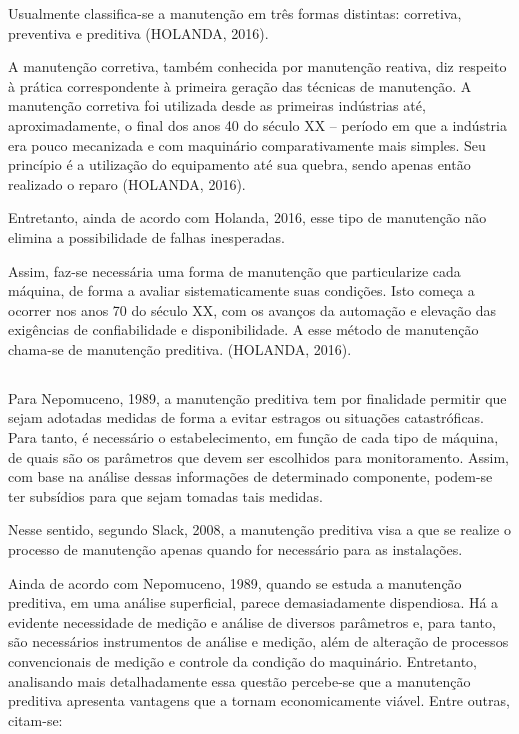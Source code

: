 \documentclass[
	12pt,				
	oneside,			
	a4paper,			
	english,			
	brazil,			
	]{abntex2ppgsi}
\begin{document}
	Usualmente classifica-se a manutenção em três formas distintas: corretiva, preventiva e preditiva (HOLANDA, 2016). 

	A manutenção corretiva, também conhecida por manutenção reativa, diz respeito à prática correspondente à primeira geração das técnicas de manutenção. A manutenção corretiva foi utilizada desde as primeiras indústrias até, aproximadamente, o final dos anos 40 do século XX – período em que a indústria era pouco mecanizada e com maquinário comparativamente mais simples. Seu princípio é a utilização do equipamento até sua quebra, sendo apenas então realizado o reparo (HOLANDA, 2016). 
	
Entretanto, ainda de acordo com Holanda, 2016, esse tipo de manutenção não elimina a possibilidade de falhas inesperadas.

Assim, faz-se necessária uma forma de manutenção que particularize cada máquina, de forma a avaliar sistematicamente suas condições. Isto começa a ocorrer nos anos 70 do século XX, com os avanços da automação e elevação das exigências de confiabilidade e disponibilidade. A esse método de manutenção chama-se de manutenção preditiva. (HOLANDA, 2016).  

\subsection{}

Para Nepomuceno, 1989, a manutenção preditiva tem por finalidade permitir que sejam adotadas medidas de forma a evitar estragos ou situações catastróficas. Para tanto, é necessário o estabelecimento, em função de cada tipo de máquina, de quais são os parâmetros que devem ser escolhidos para monitoramento. Assim, com base na análise dessas informações de determinado componente, podem-se ter subsídios para que sejam tomadas tais medidas. 

Nesse sentido, segundo Slack, 2008, a manutenção preditiva visa a que se realize o processo de manutenção apenas quando for necessário para as instalações. 

Ainda de acordo com Nepomuceno, 1989, quando se estuda a manutenção preditiva, em uma análise superficial, parece demasiadamente dispendiosa. Há a evidente necessidade de medição e análise de diversos parâmetros e, para tanto, são necessários instrumentos de análise e medição, além de alteração de processos convencionais de medição e controle da condição do maquinário. Entretanto, analisando mais detalhadamente essa questão percebe-se que a manutenção preditiva apresenta vantagens que a tornam economicamente viável. Entre outras, citam-se: 
\end{document}

